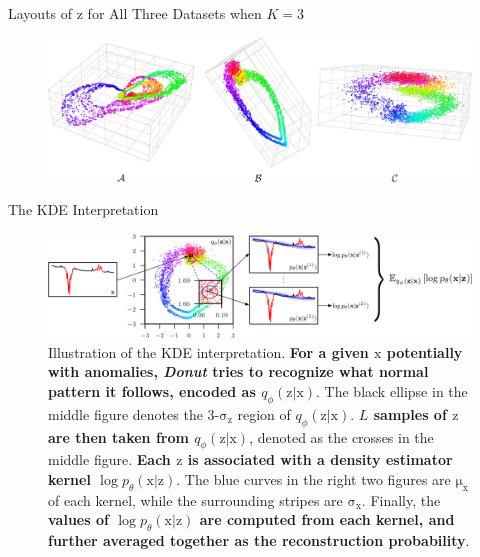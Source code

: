 \documentclass[usenames,dvipsnames]{beamer}
\newcommand{\DONUT}{\textit{Donut}}
\newcommand{\emphasis}[1]{\textbf{\textcolor{emphcolor}{#1}}}
\newcommand{\vv}[1]{\bm{\mathrm{{#1}}}}
\begin{document}
\begin{frame}{Layouts of $\vv{z}$ for All Three Datasets when $K=3$}
  \begin{figure}
    \centering
    \includegraphics[width=\textwidth]{z3_latent_space}
  \end{figure}
\end{frame}

\begin{frame}{The KDE Interpretation}
  \begin{figure}
    \centering
    \includegraphics[width=\textwidth]{kde_interpretation}
    \vspace{.5em}
    \caption{
      Illustration of the KDE interpretation.
      \emphasis{For a given $\vv{x}$ potentially with anomalies, \DONUT{} tries to recognize what normal pattern it follows, encoded as $q_{\phi}(\vv{z}|\vv{x})$}.
      The black ellipse in the middle figure denotes the 3-$\vv{\sigma_z}$ region of $q_{\phi}(\vv{z}|\vv{x})$.
      \emphasis{$L$ samples of $\vv{z}$ are then taken from $q_{\phi}(\vv{z}|\vv{x})$}, denoted as the crosses in the middle figure.
      \emphasis{Each $\vv{z}$ is associated with a density estimator kernel $\log p_{\theta}(\vv{x}|\vv{z})$}.
      The blue curves in the right two figures are $\vv{\mu_x}$ of each kernel, while the surrounding stripes are $\vv{\sigma_x}$.
      Finally, the \emphasis{values of $\log p_{\theta}(\vv{x}|\vv{z})$ are computed from each kernel, and further averaged together as the reconstruction probability}.
    }
    \label{fig:kde-interpretation}
  \end{figure}
\end{frame}
\end{document}
